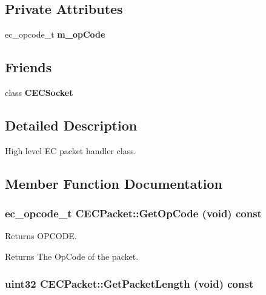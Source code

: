 \subsection*{Private Attributes}
\begin{DoxyCompactItemize}
\item 
ec\_\-opcode\_\-t {\bfseries m\_\-opCode}\label{classCECPacket_ac5345c942d16f6f3a7c5b3cefb41b16e}

\end{DoxyCompactItemize}
\subsection*{Friends}
\begin{DoxyCompactItemize}
\item 
class {\bf CECSocket}\label{classCECPacket_a6a1e30d03910fad6da0c77d42cbff7b4}

\end{DoxyCompactItemize}


\subsection{Detailed Description}
High level EC packet handler class. 

\subsection{Member Function Documentation}
\subsubsection[{GetOpCode}]{\setlength{\rightskip}{0pt plus 5cm}ec\_\-opcode\_\-t CECPacket::GetOpCode (void) const\hspace{0.3cm}{\ttfamily  [inline]}}\label{classCECPacket_a758cad68f474c8cc2b62154ce5d43617}


Returns OPCODE. \begin{DoxyReturn}{Returns}
The OpCode of the packet. 
\end{DoxyReturn}
\subsubsection[{GetPacketLength}]{\setlength{\rightskip}{0pt plus 5cm}uint32 CECPacket::GetPacketLength (void) const\hspace{0.3cm}{\ttfamily  [inline]}}\label{classCECPacket_ac57bcd383fb6b50780fe7abb281436c9}


